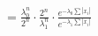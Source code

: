 \documentclass[preview]{standalone}
\begin{document}
\begin{align*}
= \frac{\lambda_0^n}{2^n} \cdot \frac{2^n}{\lambda_1^n} \cdot \frac{e^{-\lambda_0\sum |x_i|}}{e^{-\lambda_1\sum |x_i|}}
\end{align*}
\end{document}
